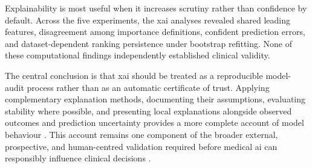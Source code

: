 Explainability is most useful when it increases scrutiny rather than confidence by default. Across the five experiments, the \gls{xai} analyses revealed shared leading features, disagreement among importance definitions, confident prediction errors, and dataset-dependent ranking persistence under bootstrap refitting. None of these computational findings independently established clinical validity.

The central conclusion is that \gls{xai} should be treated as a reproducible model-audit process rather than as an automatic certificate of trust. Applying complementary explanation methods, documenting their assumptions, evaluating stability where possible, and presenting local explanations alongside observed outcomes and prediction uncertainty provides a more complete account of model behaviour \citep{mohseni_multidisciplinary_2021, vilone_classification_2021}. This account remains one component of the broader external, prospective, and human-centred validation required before medical \gls{ai} can responsibly influence clinical decisions \citep{vasey_decideai_2022, panigutti_co-design_2023}.
